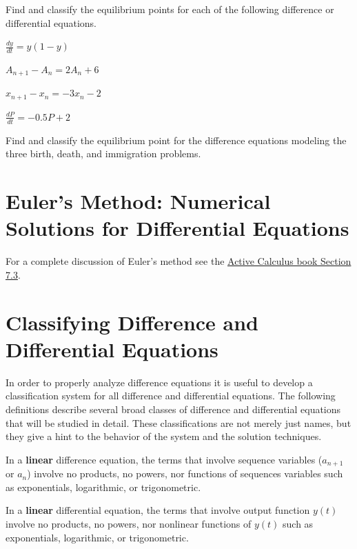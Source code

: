 \begin{problem}
    Find and classify the equilibrium points for each of the following difference or
    differential equations.
\ba
    \item $\displaystyle \frac{dy}{dt} = y(1-y)$
    \item $\displaystyle A_{n+1} - A_n = 2A_n + 6$
    \item $\displaystyle x_{n+1} - x_n = -3x_n - 2$
    \item $\displaystyle \frac{dP}{dt} = -0.5P + 2$
\ea
\end{problem}

\begin{problem}
    Find and classify the equilibrium point for the difference equations modeling the
    three birth, death, and immigration problems.
\end{problem}

\newpage
\section{Euler's Method: Numerical Solutions for Differential Equations}
For a complete discussion of Euler's method see the
\href{http://faculty.gvsu.edu/boelkinm/Home/AC/sec-7-3-euler.html}{Active Calculus book Section
7.3}.
\newpage


\section{Classifying Difference and Differential Equations}
In order to properly analyze difference equations it is useful to develop a classification
system for all difference and differential equations.  The following definitions describe
several broad classes of difference and differential equations that will be studied in
detail.  These classifications are not merely just names, but they give a hint to the
behavior of the system and the solution techniques.

\begin{definition}
    In a {\bf linear} difference equation, the terms that involve sequence variables
    ($a_{n+1}$ or $a_n$) involve no products, no powers, nor functions of sequences
    variables such as exponentials, logarithmic, or trigonometric.  
\end{definition}
\begin{definition}
    In a {\bf linear} differential equation, the terms that involve output function $y(t)$
    involve no products, no powers, nor nonlinear functions of $y(t)$ such as exponentials,
    logarithmic, or trigonometric.  
\end{definition}

